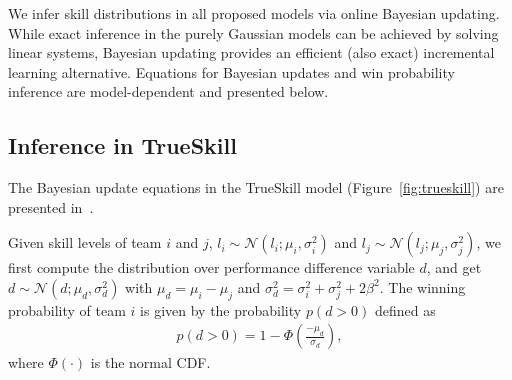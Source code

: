 \label{sec:inference}

We infer skill distributions in all proposed models via
online Bayesian updating.  While exact inference in the purely Gaussian
models can be achieved by solving linear systems, Bayesian
updating provides an efficient (also exact) incremental learning alternative.
Equations for Bayesian updates and win probability inference are
model-dependent and presented below.

\subsection{Inference in TrueSkill}

The Bayesian update equations in the TrueSkill model
(Figure~\ref{fig:trueskill}) are presented
in~\cite{herbrich06569}.

 Given skill levels of
team $i$ and $j$, $l_i\sim\mathcal{N}(l_i;\mu_i,\sigma_i^2)$ and
$l_j\sim\mathcal{N}(l_j;\mu_j,\sigma_j^2)$, we first compute the
distribution over performance difference variable $d$, and get
$d\sim\mathcal{N}(d;\mu_d,\sigma_d^2)$ with $\mu_d = \mu_i - \mu_j$
and $\sigma_d^2 = \sigma_i^2 + \sigma_j^2+2\beta^2$. The winning
probability of team $i$ is given by the probability $p(d>0)$ defined as
\begin{align}
  p(d>0) = 1 - \Phi\left(\frac{-\mu_d}{\sigma_d}\right),
\end{align}
where $\Phi(\cdot)$ is the normal CDF.

%

